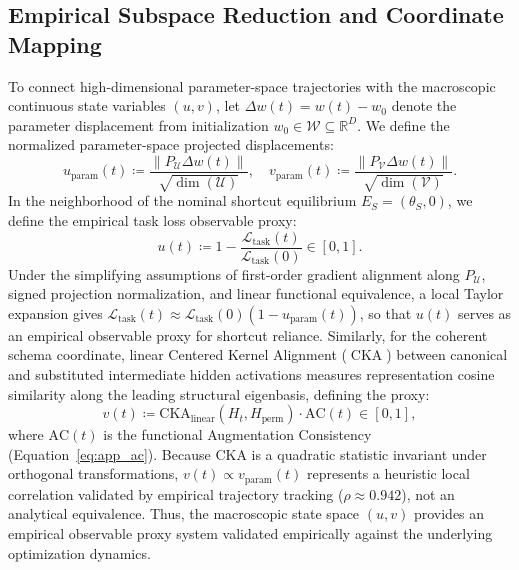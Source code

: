 \documentclass{article}
\theoremstyle{plain}
\theoremstyle{definition}
\DeclareMathOperator{\CKA}{CKA}
\begin{document}
\subsection{Empirical Subspace Reduction and Coordinate Mapping}
\label{sec:subspace_reduction}
To connect high-dimensional parameter-space trajectories with the macroscopic continuous state variables $(u, v)$, let $\Delta w(t) = w(t) - w_0$ denote the parameter displacement from initialization $w_0 \in \mathcal{W} \subseteq \mathbb{R}^D$. We define the normalized parameter-space projected displacements:
\begin{equation}
    u_{\text{param}}(t) \coloneqq \frac{\| P_{\mathcal{U}} \Delta w(t) \|}{\sqrt{\dim(\mathcal{U})}}, \quad v_{\text{param}}(t) \coloneqq \frac{\| P_{\mathcal{V}} \Delta w(t) \|}{\sqrt{\dim(\mathcal{V})}}.
    \label{eq:param_displacements}
\end{equation}
In the neighborhood of the nominal shortcut equilibrium $E_S = (\theta_S, 0)$, we define the empirical task loss observable proxy:
\begin{equation}
    u(t) \coloneqq 1 - \frac{\mathcal{L}_{\text{task}}(t)}{\mathcal{L}_{\text{task}}(0)} \in [0, 1].
    \label{eq:u_mapping}
\end{equation}
Under the simplifying assumptions of first-order gradient alignment along $P_{\mathcal{U}}$, signed projection normalization, and linear functional equivalence, a local Taylor expansion gives $\mathcal{L}_{\text{task}}(t) \approx \mathcal{L}_{\text{task}}(0)(1 - u_{\text{param}}(t))$, so that $u(t)$ serves as an empirical observable proxy for shortcut reliance. Similarly, for the coherent schema coordinate, linear Centered Kernel Alignment ($\CKA$) between canonical and substituted intermediate hidden activations measures representation cosine similarity along the leading structural eigenbasis, defining the proxy:
\begin{equation}
    v(t) \coloneqq \text{CKA}_{\text{linear}}(H_t, H_{\text{perm}}) \cdot \text{AC}(t) \in [0, 1],
    \label{eq:v_mapping}
\end{equation}
where $\text{AC}(t)$ is the functional Augmentation Consistency (Equation~\eqref{eq:app_ac}). Because CKA is a quadratic statistic invariant under orthogonal transformations, $v(t) \propto v_{\text{param}}(t)$ represents a heuristic local correlation validated by empirical trajectory tracking ($\rho \approx 0.942$), not an analytical equivalence. Thus, the macroscopic state space $(u, v)$ provides an empirical observable proxy system validated empirically against the underlying optimization dynamics.
\end{document}
